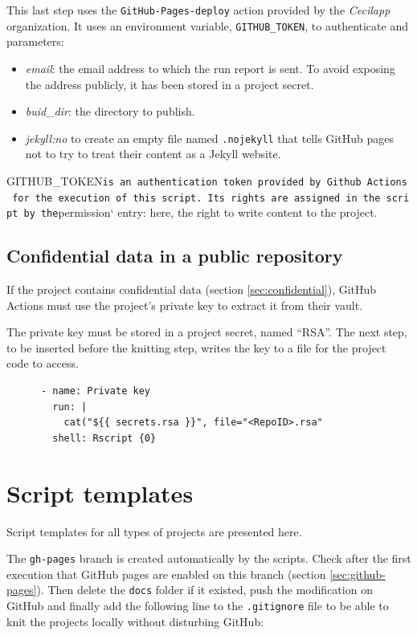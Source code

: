 \documentclass[
  12pt,
  american,
  a4paper,
  extrafontsizes,onecolumn,openright
  ]{memoir}
\providecommand{\tightlist}{%
  \setlength{\itemsep}{0pt}\setlength{\parskip}{0pt}}
\begin{document}
This last step uses the \texttt{GitHub-Pages-deploy} action provided by the \emph{Cecilapp} organization.
It uses an environment variable, \texttt{GITHUB\_TOKEN}, to authenticate and parameters:

\begin{itemize}
\tightlist
\item
  \emph{email}: the email address to which the run report is sent.
  To avoid exposing the address publicly, it has been stored in a project secret.
\item
  \emph{buid\_dir}: the directory to publish.
\item
  \emph{jekyll:no} to create an empty file named \texttt{.nojekyll} that tells GitHub pages not to try to treat their content as a Jekyll website.
\end{itemize}

GITHUB\_TOKEN\texttt{is\ an\ authentication\ token\ provided\ by\ Github\ Actions\ for\ the\ execution\ of\ this\ script.\ Its\ rights\ are\ assigned\ in\ the\ script\ by\ the}permission` entry: here, the right to write content to the project.

\subsection{Confidential data in a public repository}\label{sec:confidentielCI}

If the project contains confidential data (section \ref{sec:confidential}), GitHub Actions must use the project's private key to extract it from their vault.

The private key must be stored in a project secret, named \enquote{RSA}.
The next step, to be inserted before the knitting step, writes the key to a file for the project code to access.

\begin{verbatim}
      - name: Private key
        run: |
          cat("${{ secrets.rsa }}", file="<RepoID>.rsa"
        shell: Rscript {0}
\end{verbatim}

\section{Script templates}\label{script-templates}

Script templates for all types of projects are presented here.

The \texttt{gh-pages} branch is created automatically by the scripts.
Check after the first execution that GitHub pages are enabled on this branch (section \ref{sec:github-pages}).
Then delete the \texttt{docs} folder if it existed, push the modification on GitHub and finally add the following line to the \texttt{.gitignore} file to be able to knit the projects locally without disturbing GitHub:
\end{document}
